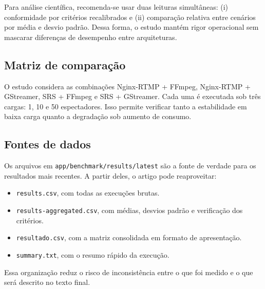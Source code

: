 Para análise científica, recomenda-se usar duas leituras simultâneas: (i) conformidade por critérios recalibrados e (ii) comparação relativa entre cenários por média e desvio padrão. Dessa forma, o estudo mantém rigor operacional sem mascarar diferenças de desempenho entre arquiteturas.

\subsection{Matriz de comparação}

O estudo considera as combinações Nginx-RTMP + FFmpeg, Nginx-RTMP + GStreamer, SRS + FFmpeg e SRS + GStreamer. Cada uma é executada sob três cargas: 1, 10 e 50 espectadores. Isso permite verificar tanto a estabilidade em baixa carga quanto a degradação sob aumento de consumo.

\subsection{Fontes de dados}

Os arquivos em \texttt{app/benchmark/results/latest} são a fonte de verdade para os resultados mais recentes. A partir deles, o artigo pode reaproveitar:

\begin{itemize}[leftmargin=1.2cm]
  \item \texttt{results.csv}, com todas as execuções brutas.
  \item \texttt{results-aggregated.csv}, com médias, desvios padrão e verificação dos critérios.
  \item \texttt{resultado.csv}, com a matriz consolidada em formato de apresentação.
  \item \texttt{summary.txt}, com o resumo rápido da execução.
\end{itemize}

Essa organização reduz o risco de inconsistência entre o que foi medido e o que será descrito no texto final.